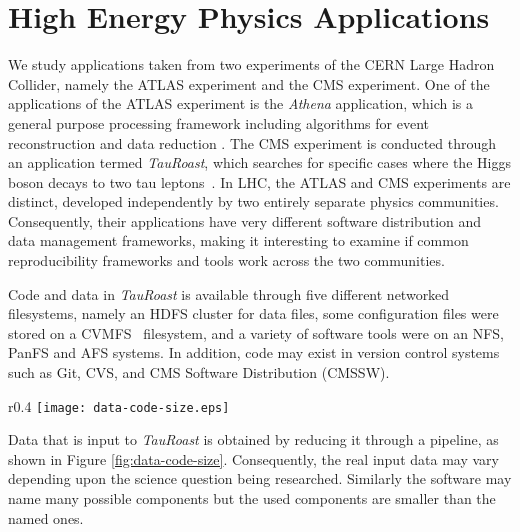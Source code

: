 


\section{High Energy Physics Applications}

We study applications taken from two experiments of the CERN Large Hadron Collider, namely the ATLAS experiment and the CMS experiment. 
One of the applications of the ATLAS experiment is the \emph{Athena} application, which is a general purpose processing framework including algorithms
for event reconstruction and data reduction \cite{calafiura2005athena}. The CMS experiment is conducted through an application termed  \emph{TauRoast}, which searches for specific 
cases where the Higgs boson decays to two tau leptons~\cite{chatrchyan2013search}. In LHC, the ATLAS and CMS experiments are distinct, 
developed independently by two entirely separate physics communities. Consequently, their applications  
have very different software distribution and data management frameworks, making it interesting to examine if common reproducibility frameworks and 
tools work across the two communities. 



Code and data in \emph{TauRoast} is available through five different networked filesystems, namely an HDFS cluster for data files, 
some configuration files were stored on a CVMFS~\cite{blomer2011cernvm} filesystem, and a variety of software tools were on an NFS, PanFS and AFS systems.
In addition, code may exist in version control systems such as Git, CVS, and CMS Software Distribution (CMSSW). %
\begin{wrapfigure}{r}{0.4\textwidth}
\small
\centering
\texttt{[image: data-code-size.eps]}
\caption{Inputs to Tau Roast}
\label{fig:data-code-size}
\end{wrapfigure}
Data that is input to \emph{TauRoast} is obtained by reducing it through a pipeline, as shown in Figure \ref{fig:data-code-size}. Consequently, the real input data may 
vary depending upon the science question being researched. Similarly the software may name many possible components but the used components are
smaller than the named ones. 

